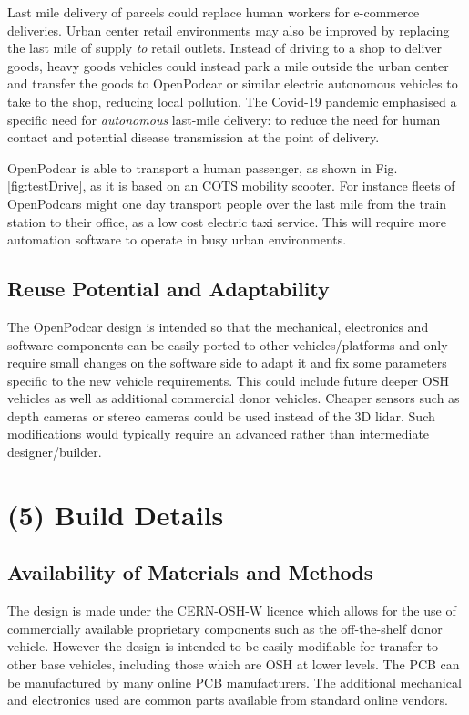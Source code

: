 \documentclass[a4paper]{article}
\begin{document}
	Last mile delivery of parcels could replace human workers for e-commerce deliveries. Urban center retail environments may also be improved by replacing the last mile of supply {\em to} retail outlets. Instead of driving to a shop to deliver goods, heavy goods vehicles could instead park a mile outside the urban center and transfer the goods to OpenPodcar or similar electric autonomous vehicles to take to the shop, reducing local pollution. The Covid-19 pandemic emphasised a specific need for {\em autonomous} last-mile delivery: to reduce the need for human contact and potential disease transmission at the point of delivery.
	
	OpenPodcar is able to transport a human passenger, as shown in Fig. \ref{fig:testDrive}, as it is based on an COTS mobility scooter.  For instance fleets of OpenPodcars might one day transport people over the last mile from the train station to their office, as a low cost electric taxi service. This will require more automation software to operate in busy urban environments.
	
	\subsection{Reuse Potential and Adaptability}\label{h.6wkumyl0ejrh}
	
	The OpenPodcar design is intended so that the mechanical, electronics and software components can be easily ported to other vehicles/platforms and only require small changes on the software side to adapt it and fix some parameters specific to the new vehicle requirements. This could include future deeper OSH vehicles as well as additional commercial donor vehicles. Cheaper sensors such as depth cameras or stereo cameras could be used instead of the 3D lidar. Such modifications would typically require an advanced rather than intermediate designer/builder.
	
	
	\section{(5) Build Details}\label{h.l8i9vokvs0bj}
	
	\subsection{Availability of Materials and Methods}\label{h.60suejv0jlzi}
	
	The design is made under the CERN-OSH-W licence which allows for the use of commercially available proprietary components such as the off-the-shelf donor vehicle. However the design is intended to be easily modifiable for transfer to other base vehicles, including those which are OSH at lower levels. The PCB can be manufactured by many online PCB manufacturers. The additional mechanical and electronics used are common parts available from standard online vendors. 
	
\end{document}

